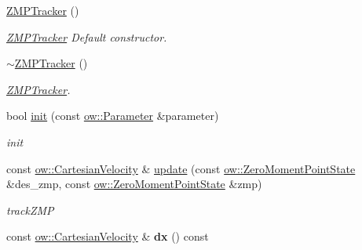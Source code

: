 \begin{DoxyCompactItemize}
\item 
\hyperlink{classow__balancer_1_1ZMPTracker_a02bb4925adb471145c42d047d59a0bd2}{Z\+M\+P\+Tracker} ()\hypertarget{classow__balancer_1_1ZMPTracker_a02bb4925adb471145c42d047d59a0bd2}{}\label{classow__balancer_1_1ZMPTracker_a02bb4925adb471145c42d047d59a0bd2}

\begin{DoxyCompactList}\small\item\em \hyperlink{classow__balancer_1_1ZMPTracker}{Z\+M\+P\+Tracker} Default constructor. \end{DoxyCompactList}\item 
\hyperlink{classow__balancer_1_1ZMPTracker_a2f8b1cee90338155cb39d244b4737162}{$\sim$\+Z\+M\+P\+Tracker} ()\hypertarget{classow__balancer_1_1ZMPTracker_a2f8b1cee90338155cb39d244b4737162}{}\label{classow__balancer_1_1ZMPTracker_a2f8b1cee90338155cb39d244b4737162}

\begin{DoxyCompactList}\small\item\em \hyperlink{classow__balancer_1_1ZMPTracker}{Z\+M\+P\+Tracker}. \end{DoxyCompactList}\item 
bool \hyperlink{classow__balancer_1_1ZMPTracker_a07c46b4c2ca4652219cc92b4bcb907f7}{init} (const \hyperlink{classow_1_1Parameter}{ow\+::\+Parameter} \&parameter)
\begin{DoxyCompactList}\small\item\em init \end{DoxyCompactList}\item 
const \hyperlink{classow__core_1_1CartesianVelocity}{ow\+::\+Cartesian\+Velocity} \& \hyperlink{classow__balancer_1_1ZMPTracker_adaa3604b9c5856aec7b322a7b8f6c705}{update} (const \hyperlink{classow__core_1_1ZeroMomentPointState}{ow\+::\+Zero\+Moment\+Point\+State} \&des\+\_\+zmp, const \hyperlink{classow__core_1_1ZeroMomentPointState}{ow\+::\+Zero\+Moment\+Point\+State} \&zmp)
\begin{DoxyCompactList}\small\item\em track\+Z\+MP \end{DoxyCompactList}\item 
const \hyperlink{classow__core_1_1CartesianVelocity}{ow\+::\+Cartesian\+Velocity} \& {\bfseries dx} () const \hypertarget{classow__balancer_1_1ZMPTracker_aacb3a9d80abfaa4233527707157f1fc9}{}\label{classow__balancer_1_1ZMPTracker_aacb3a9d80abfaa4233527707157f1fc9}

\end{DoxyCompactItemize}

